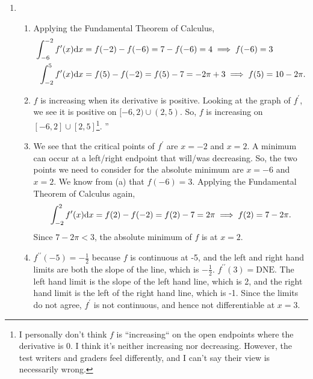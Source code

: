 \begin{enumerate}
	\item \begin{enumerate}
		\item Applying the Fundamental Theorem of Calculus,
			\begin{align*}
				\int_{-6}^{-2}{f^\prime(x)\mathrm{d} x} &= f(-2) - f(-6) = 7 - f(-6) = 4 \implies f(-6) = 3 \\
				\int_{-2}^{5}{f^\prime(x)\mathrm{d} x} &= f(5) - f(-2) = f(5) - 7 = -2\pi + 3 \implies f(5) = 10 - 2\pi.
			\end{align*}
		\item $f$ is increasing when its derivative is positive.
			Looking at the graph of $f^\prime$, we see it is positive on $[-6,2) \cup (2,5)$.
			So, $f$ is increasing on $[-6,2] \cup [2,5]$\footnote{I personally don't think $f$ is ``increasing`` on the open endpoints where the derivative is 0. I think it's neither increasing nor decreasing. However, the test writers and graders feel differently, and I can't say their view is necessarily wrong.}.
''		\item We see that the critical points of $f^\prime$ are $x=-2$ and $x=2$.
			A minimum can occur at a left/right endpoint that will/was decreasing.
			So, the two points we need to consider for the absolute minimum are $x=-6$ and $x=2$.
			We know from (a) that $f(-6)=3$.
			Applying the Fundamental Theorem of Calculus again,
			\begin{equation*}
				\int_{-2}^{2}{f^\prime(x)\mathrm{d} x} = f(2) - f(-2) = f(2) - 7 = 2\pi \implies f(2) = 7-2\pi.
			\end{equation*}
			Since  $7-2\pi < 3$, the absolute minimum of $f$ is at $x=2$.
		\item $f^{\prime\prime}(-5) = -\frac{1}{2}$ because $f$ is continuous at -5, and the left and right hand limits are both the slope of the line, which is $-\frac{1}{2}$.
			$f^{\prime\prime}(3) = \text{DNE}$.
			The left hand limit is the slope of the left hand line, which is 2, and the right hand limit is the left of the right hand line, which is -1.
			Since the limits do not agree, $f^\prime$ is not continuous, and hence not differentiable at $x=3$.
	\end{enumerate}


\end{enumerate}

